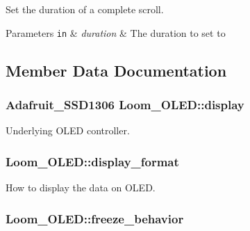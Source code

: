 Set the duration of a complete scroll. 


\begin{DoxyParams}[1]{Parameters}
\mbox{\tt in}  & {\em duration} & The duration to set to \\
\hline
\end{DoxyParams}


\subsection{Member Data Documentation}
\subsubsection[{\texorpdfstring{display}{display}}]{\setlength{\rightskip}{0pt plus 5cm}Adafruit\+\_\+\+S\+S\+D1306 Loom\+\_\+\+O\+L\+E\+D\+::display\hspace{0.3cm}{\ttfamily [protected]}}\hypertarget{class_loom___o_l_e_d_a0cc78f1f1fd95a4c3d16fe32c9d33499}{}\label{class_loom___o_l_e_d_a0cc78f1f1fd95a4c3d16fe32c9d33499}


Underlying O\+L\+ED controller. 

\subsubsection[{\texorpdfstring{display\+\_\+format}{display_format}}]{ Loom\+\_\+\+O\+L\+E\+D\+::display\+\_\+format\hspace{0.3cm}{\ttfamily [protected]}}\hypertarget{class_loom___o_l_e_d_a1cfdc8965297ea1f697d8a4d3e44b5fd}{}\label{class_loom___o_l_e_d_a1cfdc8965297ea1f697d8a4d3e44b5fd}


How to display the data on O\+L\+ED. 

\subsubsection[{\texorpdfstring{freeze\+\_\+behavior}{freeze_behavior}}]{ Loom\+\_\+\+O\+L\+E\+D\+::freeze\+\_\+behavior\hspace{0.3cm}{\ttfamily [protected]}}\hypertarget{class_loom___o_l_e_d_aafea3f7f393170a4cc7c5e7ff8583344}{}\label{class_loom___o_l_e_d_aafea3f7f393170a4cc7c5e7ff8583344}


